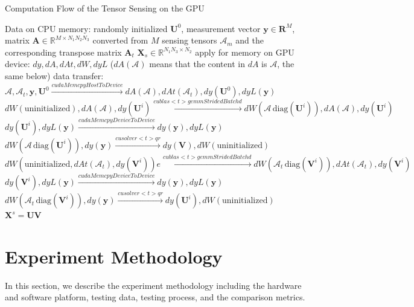 \documentclass[futureinternet,article,submit,moreauthors,pdftex,10pt,a4paper]{Definitions/mdpi}
\theoremstyle{plain}
\theoremstyle{definition}
\theoremstyle{remark}
\begin{document}
\begin{algorithm}
\caption{Computation Flow of the Tensor Sensing on the GPU}
\label{alg:GPU}
\begin{algorithmic}[1]
    \Require Data on CPU memory: randomly initialized $\mathbf{U}^0$, measurement vector $\mathbf{y} \in \mathbf{R}^M$, matrix $\mathbf{A} \in \mathbb{R}^{M \times N_1N_2N_3}$ converted from $M$ sensing tensors $\mathcal{A}_m$ and the corresponding transpose matrix $\mathbf{A}_t$
    \Ensure $\mathbf{X}_s \in \mathbb{R}^{N_1N_3 \times N_2}$
    \State apply for memory on GPU device: $dy, dA, dAt , dW, dyL$ ($dA(\mathcal{A})$ means that the content in $dA$ is $\mathcal{A}$, the same below)
    \State data transfer: $\mathcal{A}, \mathcal{A}_t, \mathbf{y}, \mathbf{U}^0 \stackrel{cudaMemcpyHostToDevice}{\longrightarrow} dA(\mathcal{A}), dAt(\mathcal{A}_t), dy(\mathbf{U}^0), dyL(\mathbf{y})$ 
        \State $dW(\text{uninitialized}), dA(\mathcal{A}), dy(\mathbf{U}^i) \stackrel{cublas<t>gemmStridedBatchd}{\longrightarrow} dW(\mathcal{A}\, \text{diag}(\mathbf{U}^i)), dA(\mathcal{A}), dy(\mathbf{U}^i)$
        \State  $dy(\mathbf{U}^i), dyL(\mathbf{y}) \stackrel{cudaMemcpyDeviceToDevice}{\longrightarrow} dy(\mathbf{y}), dyL(\mathbf{y})$
        \State $dW(\mathcal{A}\, \text{diag}(\mathbf{U}^i)), dy(\mathbf{y}) \stackrel{cusolver<t>qr}{\longrightarrow} dy(\mathbf{V}), dW(\text{uninitialized})$
        \State $dW(\text{uninitialized}, dAt(\mathcal{A}_t), dy(\mathbf{V}^i))e \stackrel{cublas<t>gemmStridedBatchd}{\longrightarrow} dW(\mathcal{A}_t\, \text{diag}(\mathbf{V}^i)), dAt(\mathcal{A}_t), dy(\mathbf{V}^i)$
        \State  $dy(\mathbf{V}^i), dyL(\mathbf{y}) \stackrel{cudaMemcpyDeviceToDevice}{\longrightarrow} dy(\mathbf{y}), dyL(\mathbf{y})$
        \State $dW(\mathcal{A}_t\, \text{diag}(\mathbf{V}^i)), dy(\mathbf{y}) \stackrel{cusolver<t>qr}{\longrightarrow} dy(\mathbf{U}^i), dW(\text{uninitialized})$
    \EndFor
    \State \Return $\mathbf{X}^s = \mathbf{U}\mathbf{V}$
\end{algorithmic}
\end{algorithm}

\section{Experiment Methodology}
\label{SEC_EXP}
In this section, we describe the experiment methodology including the hardware and software platform, testing data, testing process, and the comparison metrics.
\end{document}
